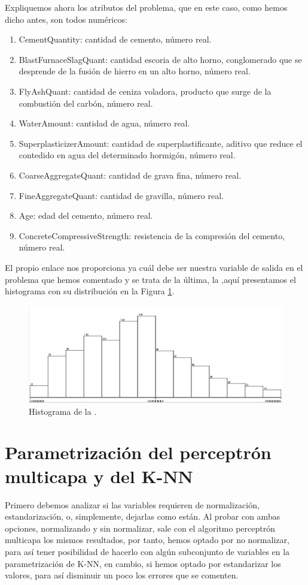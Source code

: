 \documentclass[a4paper, 11pt, twoside, openany, onecolumn, final]{memoir}
\begin{document}
	Expliquemos ahora los atributos del problema, que en este caso, como hemos dicho antes, son todos numéricos:
	\begin{enumerate}
\item CementQuantity: cantidad de cemento, número real.
\item BlastFurnaceSlagQuant: cantidad escoria de alto horno, conglomerado que se desprende de la fusión de hierro en un alto horno, número real.
\item FlyAshQuant: cantidad de ceniza voladora, producto que surge de la combustión del carbón, número real.
\item WaterAmount: cantidad de agua, número real.
\item SuperplasticizerAmount: cantidad de superplastificante, aditivo que reduce el contedido en agua del determinado hormigón, número real.
\item CoarseAggregateQuant: cantidad de grava fina, número real.
\item FineAggregateQuant: cantidad de gravilla, número real.
\item Age: edad del cemento, número real.
\item ConcreteCompressiveStrength: resistencia de la compresión del cemento, número real.
\end{enumerate}

	El propio enlace nos proporciona ya cuál debe ser nuestra variable de salida en el problema que hemos comentado y se trata de la última, la ,aquí presentamos el histograma con su distribución en la Figura \ref{HistoVarSalidaRegre}.
	
	\begin{figure}
  		\centering
   	\includegraphics[width=1\textwidth]{Imagenes/HistogramaVarSalRegre}
  		\caption{Histograma de la .}
  		\label{HistoVarSalidaRegre}
	\end{figure}
	\section{Parametrización del perceptrón multicapa y del K-NN}
	Primero debemos analizar si las variables requieren de normalización, estandarización, o, simplemente, dejarlas como están. Al probar con ambas opciones, normalizando y sin normalizar, sale con el algoritmo perceptrón multicapa los mismos resultados, por tanto, hemos optado por no normalizar, para así tener posibilidad de hacerlo con algún subconjunto de variables en la parametrización de K-NN, en cambio, si hemos optado por estandarizar los valores, para así disminuir un poco los errores que se comenten.
	
\end{document}
